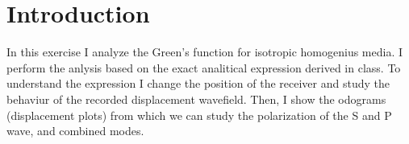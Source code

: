 \section{Introduction}
In this exercise I analyze the Green's function for isotropic homogenius media. I perform
the anlysis based on the exact analitical expression derived in class. To understand the
expression I change the position of the receiver and study the behaviur of the recorded displacement wavefield.
Then, I show the odograms (displacement plots) from which we can study the polarization of the 
S and P wave, and combined modes.  